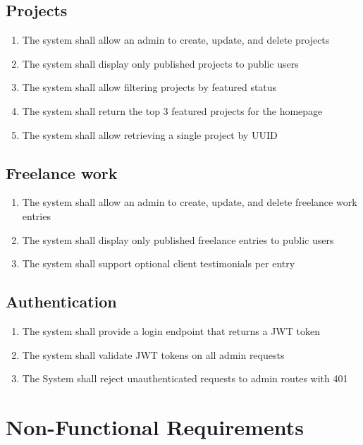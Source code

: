 \documentclass[11pt,a4paper]{article}
\begin{document}
	\subsection{Projects}
	\begin{enumerate}[label=\textbf{FR-\arabic*:}, leftmargin=2cm, itemsep=0.2em, resume]
		\item The system shall allow an admin to create, update, and delete projects
		\item The system shall display only published projects to public users
		\item The system shall allow filtering projects by featured status
		\item The system shall return the top 3 featured projects for the homepage
		\item The system shall allow retrieving a single project by UUID
	\end{enumerate}
	
	\subsection{Freelance work}
	\begin{enumerate}[label=\textbf{FR-\arabic*:}, leftmargin=2cm, itemsep=0.2em, resume]
		\item The system shall allow an admin to create, update, and delete freelance work entries
		\item The system shall display only published freelance entries to public users
		\item The system shall support optional client testimonials per entry
	\end{enumerate}
	
	\subsection{Authentication}
	\begin{enumerate}[label=\textbf{FR-\arabic*:}, leftmargin=2cm, itemsep=0.2em, resume]
		\item The system shall provide a login endpoint that returns a JWT token
		\item The system shall validate JWT tokens on all admin requests
		\item The System shall reject unauthenticated requests to admin routes with 401
	\end{enumerate}
	
	\section{Non-Functional Requirements}
\end{document}
